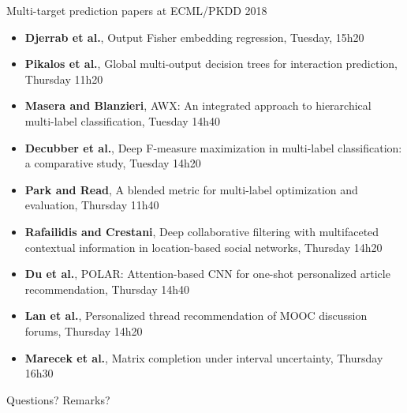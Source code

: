 \documentclass[]{beamer}
\renewcommand{\alert}[1]{\textbf{\color{putblue} #1}}
\begin{document}
\begin{frame}{Multi-target prediction papers at ECML/PKDD 2018}

\begin{itemize}
\item \alert{Djerrab et al.}, Output Fisher embedding regression, Tuesday, 15h20 \pause
\item \alert{Pikalos et al.}, Global multi-output decision trees for interaction prediction, Thursday 11h20 \pause 
\item \alert{Masera and Blanzieri}, AWX: An integrated approach to hierarchical multi-label classification, Tuesday 14h40 \pause 
\item \alert{Decubber et al.}, Deep F-measure maximization in multi-label classification: a comparative study, Tuesday 14h20 \pause 
\item \alert{Park and Read}, A blended metric for multi-label optimization and evaluation, Thursday 11h40 \pause 
\item \alert{Rafailidis and Crestani}, Deep collaborative filtering with multifaceted contextual information in location-based social networks, Thursday 14h20 \pause 
\item \alert{Du et al.}, POLAR: Attention-based CNN for one-shot personalized article recommendation, Thursday 14h40 \pause 
\item \alert{Lan et al.}, Personalized thread recommendation of MOOC discussion forums, Thursday 14h20 \pause 
\item \alert{Marecek et al.}, Matrix completion under interval uncertainty, Thursday 16h30
\end{itemize}

\end{frame}

\begin{frame}{Questions? Remarks?}

\end{frame}

%
%
\end{document}
